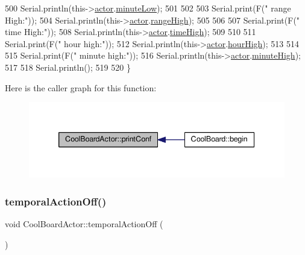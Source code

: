 \begin{DoxyCode}
500     Serial.println(this->\hyperlink{class_cool_board_actor_a8f190db9f7a39fddbcef7f152da970e9}{actor}.\hyperlink{struct_cool_board_actor_1_1state_acbcc2902331fd9d757cd475eb403bdd9}{minuteLow});
501 
502 
503     Serial.print(F(\textcolor{stringliteral}{" range High:"}));
504     Serial.println(this->\hyperlink{class_cool_board_actor_a8f190db9f7a39fddbcef7f152da970e9}{actor}.\hyperlink{struct_cool_board_actor_1_1state_a6e5cd6c5cd44e2decfd8d4df1853f8e3}{rangeHigh});
505 
506 
507     Serial.print(F(\textcolor{stringliteral}{" time High:"}));
508     Serial.println(this->\hyperlink{class_cool_board_actor_a8f190db9f7a39fddbcef7f152da970e9}{actor}.\hyperlink{struct_cool_board_actor_1_1state_a54cd4976b56aeaa6274fe0576aaebb0f}{timeHigh});
509 
510 
511     Serial.print(F(\textcolor{stringliteral}{" hour high:"}));
512     Serial.println(this->\hyperlink{class_cool_board_actor_a8f190db9f7a39fddbcef7f152da970e9}{actor}.\hyperlink{struct_cool_board_actor_1_1state_acd1af3ac2382258a5b05497d814adc01}{hourHigh});
513 
514 
515     Serial.print(F(\textcolor{stringliteral}{" minute high:"}));
516     Serial.println(this->\hyperlink{class_cool_board_actor_a8f190db9f7a39fddbcef7f152da970e9}{actor}.\hyperlink{struct_cool_board_actor_1_1state_a4bff3d61ead74adb60be224764b93006}{minuteHigh});
517 
518     Serial.println(); 
519 
520 \}
\end{DoxyCode}
Here is the caller graph for this function\+:
\nopagebreak
\begin{figure}[H]
\begin{center}
\leavevmode
\includegraphics[width=339pt]{dc/d69/class_cool_board_actor_aabb10e7aebc3249ffc940530de29f84a_icgraph}
\end{center}
\end{figure}
\mbox{\label{class_cool_board_actor_a02698bd647df49cabbe74513d4d88918}} 
\subsubsection{\texorpdfstring{temporal\+Action\+Off()}{temporalActionOff()}}
{\footnotesize\ttfamily void Cool\+Board\+Actor\+::temporal\+Action\+Off (\begin{DoxyParamCaption}{ }\end{DoxyParamCaption})}

